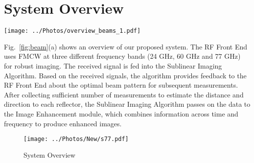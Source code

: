 \vspace{-4mm}
\section{System Overview}
\vspace{-2mm}



\begin{figure*}[t]
	\centering
	\texttt{[image: ../Photos/overview\_beams\_1.pdf]}
	\caption{\footnotesize{(a) System Overview (b) 24GHz, 77GHz antenna (c) 60GHz Hardware Setup (d-e) Multi-armed beam patterns}}
	\label{fig:beam}
\end{figure*}


Fig.~\ref{fig:beam}(a) shows an overview of our proposed system. The {RF Front End} uses FMCW at three different frequency bands (24 GHz, 60 GHz and 77 GHz) for robust imaging. %
The received signal is fed into the {Sublinear Imaging Algorithm}.
Based on the received signals, the algorithm provides feedback to the {RF Front End} about the optimal beam pattern for subsequent measurements. After collecting sufficient number of  measurements to estimate the distance and direction to each reflector, the {Sublinear Imaging Algorithm} passes on the data to the {Image Enhancement} module, which combines information across time and frequency to produce enhanced images.




\iffalse



\begin{figure}
	\centering
	\texttt{[image: ../Photos/New/s77.pdf]}
	\caption{\footnotesize{System Overview}}
	\label{fig:system1}
\end{figure}




